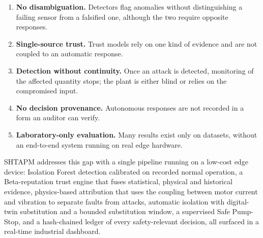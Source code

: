 \begin{enumerate}
  \item \textbf{No disambiguation.} Detectors flag anomalies without distinguishing a failing sensor from a falsified one, although the two require opposite responses.
  \item \textbf{Single-source trust.} Trust models rely on one kind of evidence and are not coupled to an automatic response.
  \item \textbf{Detection without continuity.} Once an attack is detected, monitoring of the affected quantity stops; the plant is either blind or relies on the compromised input.
  \item \textbf{No decision provenance.} Autonomous responses are not recorded in a form an auditor can verify.
  \item \textbf{Laboratory-only evaluation.} Many results exist only on datasets, without an end-to-end system running on real edge hardware.
\end{enumerate}

SHTAPM addresses this gap with a single pipeline running on a low-cost edge device: Isolation Forest detection calibrated on recorded normal operation, a Beta-reputation trust engine that fuses statistical, physical and historical evidence, physics-based attribution that uses the coupling between motor current and vibration to separate faults from attacks, automatic isolation with digital-twin substitution and a bounded substitution window, a supervised Safe Pump-Stop, and a hash-chained ledger of every safety-relevant decision, all surfaced in a real-time industrial dashboard.
